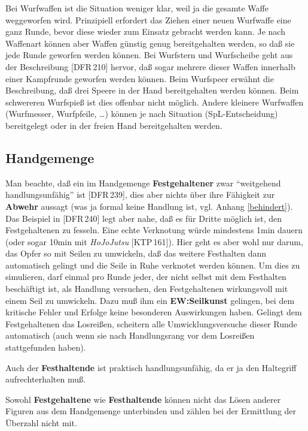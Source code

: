 \documentclass[10pt,a4paper,germanpar]{article}
\begin{document}
Bei Wurfwaffen ist die Situation weniger klar, weil ja die gesamte
Waffe weggeworfen wird. Prinzipiell erfordert das Ziehen einer neuen
Wurfwaffe eine ganz Runde, bevor diese wieder zum Einsatz gebracht
werden kann. Je nach Waffenart können aber Waffen günstig genug
bereitgehalten werden, so daß sie jede Runde geworfen werden
können. Bei Wurfstern und Wurfscheibe geht aus der Beschreibung
[DFR\,210] hervor, daß sogar mehrere dieser Waffen innerhalb einer
Kampfrunde geworfen werden können. Beim Wurfspeer erwähnt die
Beschreibung, daß drei Speere in der Hand bereitgehalten werden
können. Beim schwereren Wurfspieß ist dies offenbar nicht
möglich. Andere kleinere Wurfwaffen (Wurfmesser, Wurfpfeile, \dots)
können je nach Situation (SpL-Entscheidung) bereitgelegt oder
in der freien Hand bereitgehalten werden.

\subsection{Handgemenge}

Man beachte, daß ein im Handgemenge \textbf{Festgehaltener} zwar
"`weitgehend handlungsunfähig"' ist [DFR\,239], dies aber nichts über
ihre Fähigkeit zur \textbf{Abwehr} aussagt (was ja formal keine
Handlung ist, vgl. Anhang \ref{behindert}). Das Beispiel in [DFR\,240]
legt aber nahe, daß es für Dritte möglich ist, den Festgehaltenen zu
fesseln. Eine echte Verknotung würde mindestens 1min dauern (oder
sogar 10min mit \emph{HoJoJutsu} [KTP\,161]). Hier geht es aber wohl
nur darum, das Opfer so mit Seilen zu umwickeln, daß das weitere
Festhalten dann automatisch gelingt und die Seile in Ruhe verknotet
werden können. Um dies zu simulieren, darf einmal pro Runde jeder, der
nicht selbst mit dem Festhalten beschäftigt ist, als Handlung
versuchen, den Festgehaltenen wirkungsvoll mit einem Seil zu
umwickeln. Dazu muß ihm ein \textbf{EW:Seilkunst} gelingen, bei dem
kritische Fehler und Erfolge keine besonderen Auswirkungen haben.
Gelingt dem Festgehaltenen das Losreißen, scheitern alle
Umwicklungsversuche dieser Runde automatisch (auch wenn sie nach
Handlungsrang vor dem Losreißen stattgefunden haben).

Auch der \textbf{Festhaltende} ist praktisch handlungsunfähig, da er
ja den Haltegriff aufrechterhalten muß.

Sowohl \textbf{Festgehaltene} wie \textbf{Festhaltende} können nicht
das Lösen anderer Figuren aus dem Handgemenge unterbinden und zählen
bei der Ermittlung der Überzahl nicht mit.
\end{document}
